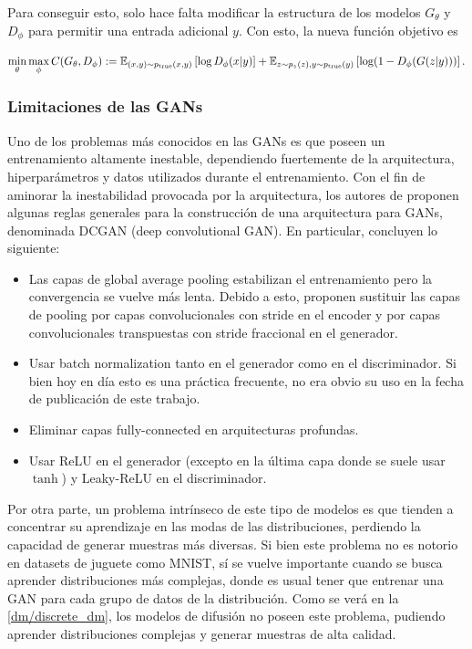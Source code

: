 Para conseguir esto, solo hace falta modificar la estructura de los modelos $G_\theta$ y $D_\phi$ para permitir una entrada adicional $y$. Con esto, la nueva función objetivo es

\begin{equation*}
	\min_\theta\max_\phi C(G_\theta, D_\phi) := \mathbb{E}_{(x,y)\sim p_{\operatorname{true}}(x,y)}\left[\log D_\phi(x|y)\right] + \mathbb{E}_{z\sim p_z(z),y\sim p_{\operatorname{true}}(y)}\left[\log (1-D_\phi(G(z|y)))\right].
\end{equation*}

\subsubsection{Limitaciones de las GANs}

Uno de los problemas más conocidos en las GANs es que poseen un entrenamiento altamente inestable, dependiendo fuertemente de la arquitectura, hiperparámetros y datos utilizados durante el entrenamiento. Con el fin de aminorar la inestabilidad provocada por la arquitectura, los autores de \cite{radford2016unsupervised} proponen algunas reglas generales para la construcción de una arquitectura para GANs, denominada DCGAN (deep convolutional GAN). En particular, concluyen lo siguiente:

\begin{itemize}
	\item Las capas de global average pooling estabilizan el entrenamiento pero la convergencia se vuelve más lenta. Debido a esto, proponen sustituir las capas de pooling por capas convolucionales con stride en el encoder y por capas convolucionales transpuestas con stride fraccional en el generador.
	\item Usar batch normalization \cite{ioffe2015batch} tanto en el generador como en el discriminador. Si bien hoy en día esto es una práctica frecuente, no era obvio su uso en la fecha de publicación de este trabajo.
	\item Eliminar capas fully-connected en arquitecturas profundas.
	\item Usar ReLU en el generador (excepto en la última capa donde se suele usar $\tanh$) y Leaky-ReLU en el discriminador.
\end{itemize}

Por otra parte, un problema intrínseco de este tipo de modelos es que tienden a concentrar su aprendizaje en las modas de las distribuciones, perdiendo la capacidad de generar muestras más diversas. Si bien este problema no es notorio en datasets de juguete como MNIST, sí se vuelve importante cuando se busca aprender distribuciones más complejas, donde es usual tener que entrenar una GAN para cada grupo de datos de la distribución. Como se verá en la \autoref{dm/discrete_dm}, los modelos de difusión no poseen este problema, pudiendo aprender distribuciones complejas y generar muestras de alta calidad.

